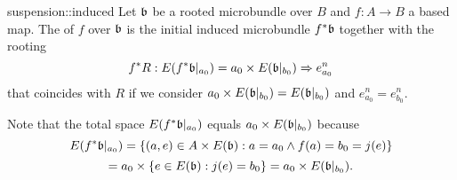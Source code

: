 \begin{mydefinition}{suspension::induced}
    Let $\mathfrak{b}$ be a rooted microbundle over $B$ and $f: A \to B$ a based map.
    The  of $f$ over $\mathfrak{b}$
    is the initial induced microbundle $f^*\mathfrak{b}$ together with the rooting
    \[
        f^*R: E(f^*\mathfrak{b}\vert_{a_0})
        = a_0 \times E(\mathfrak{b}\vert_{b_0}) \Rightarrow{} e^n_{a_0}
    \]
    that coincides with $R$ if we consider
    $a_0 \times E(\mathfrak{b}\vert_{b_0}) = E(\mathfrak{b}\vert_{b_0})$ and $e^n_{a_0} = e^n_{b_0}$.
\end{mydefinition}

\begin{myparagraph}
    Note that the total space $E(f^*\mathfrak{b}\vert_{a_0})$ equals $a_0 \times E(\mathfrak{b}\vert_{b_0})$ because
    \[
        E(f^*\mathfrak{b}\vert_{a_0})
        = \{(a, e) \in A \times E(\mathfrak{b}):a = a_0 \land f(a) = b_0 = j(e)\}
    \]
    \[
        = a_0 \times \{e \in E(\mathfrak{b}):j(e) = b_0\}
        = a_0 \times E(\mathfrak{b}\vert_{b_0}).
    \]
\end{myparagraph}